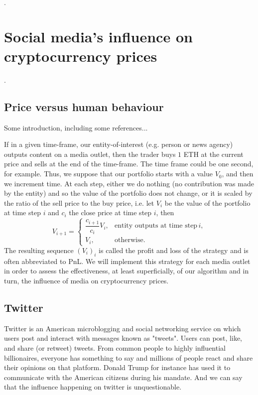 \documentclass[twoside]{report}
\begin{document}
\begin{spacing}{1}
.

\chapter{Social media's influence on cryptocurrency prices}
.
\section{Price versus human behaviour}\label{sec:pricevshumanbehaviour}
Some introduction, including some references...
\begin{strategy}\label{PnLgeneralstrat}
If in a given time-frame, our entity-of-interest (e.g. person or news agency) outputs content on a media outlet, then the trader buys $1$ ETH at the current price and sells at the end of the time-frame. The time frame could be one second, for example. Thus, we suppose that our portfolio starts with a value $V_0$, and then we increment time. At each step, either we do nothing (no contribution was made by the entity) and so the value of the portfolio does not change, or it is scaled by the ratio of the sell price to the buy price, i.e. let $V_i$ be the value of the portfolio at time step $i$ and $c_i$ the close price at time step $i$, then \[
V_{i+1} = \begin{cases}
\dfrac{c_{i+1}}{c_i}V_i, & \text{entity outputs at time step}\, i,\\
V_i, & \text{otherwise}.
\end{cases}
\] 
The resulting sequence $(V_i)_i$ is called the profit and loss of the strategy and is often abbreviated to PnL. We will implement this strategy for each media outlet in order to assess the effectiveness, at least superficially, of our algorithm and in turn, the influence of media on cryptocurrency prices. 
\end{strategy} 

\section{Twitter}
Twitter is an American microblogging and social networking service on which users post and interact with messages known as "tweets". Users can post, like, and share (or retweet) tweets.
From common people to highly influential billionaires, everyone has something to say and millions of people react and share their opinions on that platform. Donald Trump for instance has used it to communicate with the American citizens during his mandate. And we can say that the influence happening on twitter is unquestionable.\\


\end{spacing}
\end{document}
